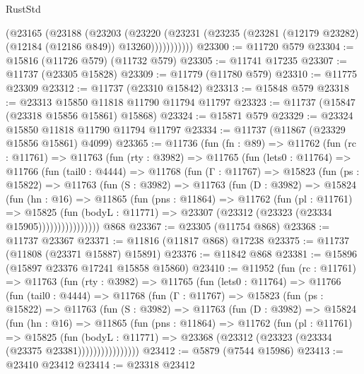 \begin{lexlean}{RustStd}
\begin{coremodule}
            (@23165
              (@23188
                (@23203
                  (@23220
                    (@23231 (@23235 (@23281 (@12179 @23282) (@12184 (@12186 @849)) @13260)))))))))))
@23300 := @11720 @579
@23304 := @15816 (@11726 @579) (@11732 @579)
@23305 := @11741 @17235
@23307 := @11737 (@23305 @15828)
@23309 := @11779 (@11780 @579)
@23310 := @11775 @23309
@23312 := @11737 (@23310 @15842)
@23313 := @15848 @579
@23318 := @23313 @15850 @11818 @11790 @11794 @11797
@23323 := @11737 (@15847 (@23318 @15856 @15861) @15868)
@23324 := @15871 @579
@23329 := @23324 @15850 @11818 @11790 @11794 @11797
@23334 := @11737 (@11867 (@23329 @15856 @15861) @4099)
@23365 := @11736
    (fun (fn : @89) =>
    @11762
      (fun (rc : @11761) =>
      @11763
        (fun (rty : @3982) =>
        @11765
          (fun (lets0 : @11764) =>
          @11766
            (fun (tail0 : @4444) =>
            @11768
              (fun (Γ : @11767) =>
              @15823
                (fun (ps : @15822) =>
                @11763
                  (fun (S : @3982) =>
                  @11763
                    (fun (D : @3982) =>
                    @15824
                      (fun (hn : @16) =>
                      @11865
                        (fun (pns : @11864) =>
                        @11762
                          (fun (pl : @11761) =>
                          @15825
                            (fun (bodyL : @11771) =>
                            @23307 (@23312 (@23323 (@23334 @15905))))))))))))))))
    @868
@23367 := @23305 (@11754 @868)
@23368 := @11737 @23367
@23371 := @11816 (@11817 @868) @17238
@23375 := @11737 (@11808 (@23371 @15887) @15891)
@23376 := @11842 @868
@23381 := @15896 (@15897 @23376 @17241 @15858 @15860)
@23410 := @11952
    (fun (rc : @11761) =>
    @11763
      (fun (rty : @3982) =>
      @11765
        (fun (lets0 : @11764) =>
        @11766
          (fun (tail0 : @4444) =>
          @11768
            (fun (Γ : @11767) =>
            @15823
              (fun (ps : @15822) =>
              @11763
                (fun (S : @3982) =>
                @11763
                  (fun (D : @3982) =>
                  @15824
                    (fun (hn : @16) =>
                    @11865
                      (fun (pns : @11864) =>
                      @11762
                        (fun (pl : @11761) =>
                        @15825
                          (fun (bodyL : @11771) =>
                          @23368 (@23312 (@23323 (@23334 (@23375 @23381))))))))))))))))
@23412 := @5879 (@7544 @15986)
@23413 := @23410 @23412
@23414 := @23318 @23412

\end{coremodule}
\end{lexlean}
